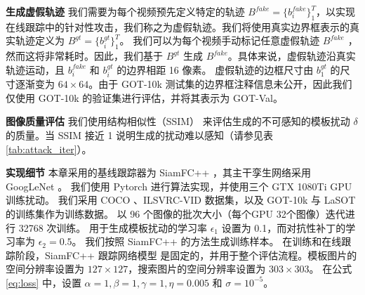 \textbf{生成虚假轨迹} 我们需要为每个视频预先定义特定的轨迹 $B^{fake}=\{b^{fake}_i\}_1^{T}$，以实现在线跟踪中的针对性攻击，我们称之为虚假轨迹。我们将使用真实边界框表示的真实轨迹定义为 $B^{gt}=\{b^{gt}_i\}_1^T$。
我们可以为每个视频手动标记任意虚假轨迹 $B^{fake}$ ，然而这将非常耗时。因此，我们基于 $B^{gt}$ 生成 $B^{fake}$。具体来说，虚假轨迹沿真实轨迹运动，且 $b^{fake}_i$ 和 $b^{gt}_i$ 的边界相距 16 像素。
虚假轨迹的边框尺寸由 $b^{gt}_1$ 的尺寸逐渐变为 $64\times 64$。由于 GOT-10k 测试集的边界框注释信息未公开，因此我们仅使用 GOT-10k 的验证集进行评估，并将其表示为 GOT-Val。

\textbf{图像质量评估} 我们使用结构相似性（SSIM）\cite{SSIM} 来评估生成的不可感知的模板扰动 $\delta$ 的质量。当 SSIM 接近 1 说明生成的扰动难以感知（请参见表 \ref{tab:attack_iter}）。

\textbf{实现细节} 本章采用的基线跟踪器为 SiamFC++ \cite{SiamFC++}，其主干孪生网络采用 GoogLeNet \cite{GoogLeNet}。
我们使用 Pytorch 进行算法实现，并使用三个 GTX 1080Ti GPU 训练扰动。
我们采用 COCO \cite{COCO}、ILSVRC-VID \cite{VID} 数据集，以及 GOT-10k \cite{GOT-10k} 与 LaSOT \cite{LaSOT} 的训练集作为训练数据。
以 96 个图像的批次大小（每个GPU 32个图像）迭代进行 32768 次训练。
用于生成模板扰动的学习率 $\epsilon_1$ 设置为 0.1，而对抗性补丁的学习率为 $\epsilon_2 = 0.5$。
我们按照 SiamFC++ 的方法生成训练样本。
在训练和在线跟踪阶段，SiamFC++ 跟踪网络模型
是固定的，并用于整个评估流程。模板图片的空间分辨率设置为 $127\times 127$，搜索图片的空间分辨率设置为 $303\times 303$。
在公式 \ref{eq:loss} 中，设置 $\alpha=1, \beta=1, \gamma=1, \eta=0.005$ 和 $\sigma=10^{-5}$。

